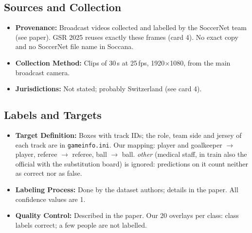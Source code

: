\documentclass[11pt, a4paper]{article}
\begin{document}
\subsection{Sources and Collection}
\begin{itemize}
    \item \textbf{Provenance:} Broadcast videos collected and labelled by the SoccerNet team (see paper). GSR 2025 reuses exactly these frames (card 4). No exact copy and no SoccerNet file name in Soccana.
    \item \textbf{Collection Method:} Clips of 30\,s at 25\,fps, 1920$\times$1080, from the main broadcast camera.
    \item \textbf{Jurisdictions:} Not stated; probably Switzerland (see card 4).
\end{itemize}

\subsection{Labels and Targets}
\begin{itemize}
    \item \textbf{Target Definition:} Boxes with track IDs; the role, team side and jersey of each track are in \texttt{gameinfo.ini}. Our mapping: player and goalkeeper $\rightarrow$ player, referee $\rightarrow$ referee, ball $\rightarrow$ ball. \emph{other} (medical staff, in train also the official with the substitution board) is ignored: predictions on it count neither as correct nor as false.
    \item \textbf{Labeling Process:} Done by the dataset authors; details in the paper. All confidence values are 1.
    \item \textbf{Quality Control:} Described in the paper. Our 20 overlays per class: class labels correct; a few people are not labelled.
\end{itemize}
\end{document}
